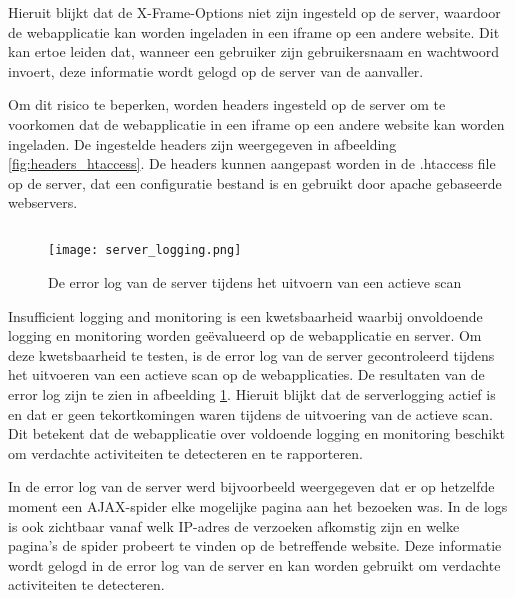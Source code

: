 Hieruit blijkt dat de X-Frame-Options niet zijn ingesteld op de server, waardoor de webapplicatie kan worden ingeladen in een 
iframe op een andere website. Dit kan ertoe leiden dat, wanneer een gebruiker zijn gebruikersnaam en wachtwoord
invoert, deze informatie wordt gelogd op de server van de aanvaller.

Om dit risico te beperken, worden headers ingesteld op de server om te voorkomen dat de webapplicatie in een iframe op een 
andere website kan worden ingeladen. De ingestelde headers zijn weergegeven in afbeelding \ref{fig:headers_htaccess}. De 
headers kunnen aangepast worden in de .htaccess file op de server, dat een configuratie bestand is en gebruikt door apache 
gebaseerde webservers.

\subsection{}
\begin{figure}
    \centering
    \texttt{[image: server\_logging.png]}
    \caption[De error log van de server tijdens het uitvoern van een actieve scan]{De error log van de server tijdens het uitvoern van een actieve scan}
    \label{fig:server_logging}
\end{figure}
Insufficient logging and monitoring is een kwetsbaarheid waarbij onvoldoende logging en monitoring worden geëvalueerd op de 
webapplicatie en server. Om deze kwetsbaarheid te testen, is de error log van de server gecontroleerd tijdens het uitvoeren van een 
actieve scan op de webapplicaties. De resultaten van de error log zijn te zien in afbeelding \ref{fig:server_logging}. 
Hieruit blijkt dat de serverlogging actief is en dat er geen tekortkomingen waren tijdens de uitvoering van de actieve scan. 
Dit betekent dat de webapplicatie over voldoende logging en monitoring beschikt om verdachte activiteiten te detecteren en te 
rapporteren.

In de error log van de server werd bijvoorbeeld weergegeven dat er op hetzelfde moment een AJAX-spider elke mogelijke pagina aan 
het bezoeken was. In de logs is ook zichtbaar vanaf welk IP-adres de verzoeken afkomstig zijn en welke pagina's de spider 
probeert te vinden op de betreffende website. Deze informatie wordt gelogd in de error log van de server en kan worden 
gebruikt om verdachte activiteiten te detecteren.

